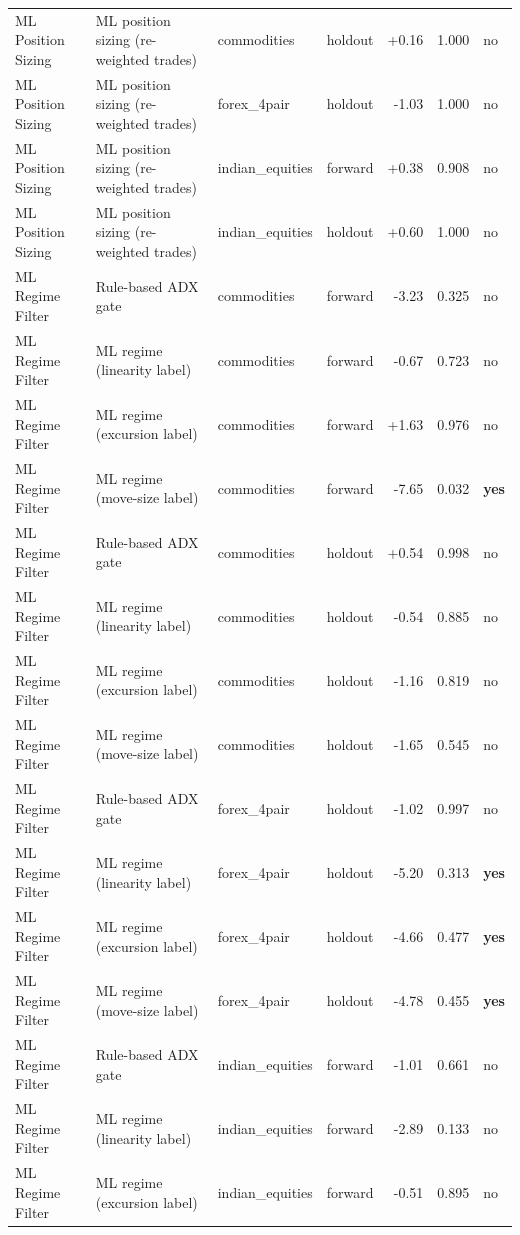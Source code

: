 \begin{longtable}{p{2.6cm} p{3.3cm} l l r r l}
ML Position Sizing & ML position sizing (re-weighted trades) & commodities & holdout & +0.16 & 1.000 & no \\
ML Position Sizing & ML position sizing (re-weighted trades) & forex\_4pair & holdout & -1.03 & 1.000 & no \\
ML Position Sizing & ML position sizing (re-weighted trades) & indian\_equities & forward & +0.38 & 0.908 & no \\
ML Position Sizing & ML position sizing (re-weighted trades) & indian\_equities & holdout & +0.60 & 1.000 & no \\
ML Regime Filter & Rule-based ADX gate & commodities & forward & -3.23 & 0.325 & no \\
ML Regime Filter & ML regime (linearity label) & commodities & forward & -0.67 & 0.723 & no \\
ML Regime Filter & ML regime (excursion label) & commodities & forward & +1.63 & 0.976 & no \\
ML Regime Filter & ML regime (move-size label) & commodities & forward & -7.65 & 0.032 & \textbf{yes} \\
ML Regime Filter & Rule-based ADX gate & commodities & holdout & +0.54 & 0.998 & no \\
ML Regime Filter & ML regime (linearity label) & commodities & holdout & -0.54 & 0.885 & no \\
ML Regime Filter & ML regime (excursion label) & commodities & holdout & -1.16 & 0.819 & no \\
ML Regime Filter & ML regime (move-size label) & commodities & holdout & -1.65 & 0.545 & no \\
ML Regime Filter & Rule-based ADX gate & forex\_4pair & holdout & -1.02 & 0.997 & no \\
ML Regime Filter & ML regime (linearity label) & forex\_4pair & holdout & -5.20 & 0.313 & \textbf{yes} \\
ML Regime Filter & ML regime (excursion label) & forex\_4pair & holdout & -4.66 & 0.477 & \textbf{yes} \\
ML Regime Filter & ML regime (move-size label) & forex\_4pair & holdout & -4.78 & 0.455 & \textbf{yes} \\
ML Regime Filter & Rule-based ADX gate & indian\_equities & forward & -1.01 & 0.661 & no \\
ML Regime Filter & ML regime (linearity label) & indian\_equities & forward & -2.89 & 0.133 & no \\
ML Regime Filter & ML regime (excursion label) & indian\_equities & forward & -0.51 & 0.895 & no \\

\end{longtable}
